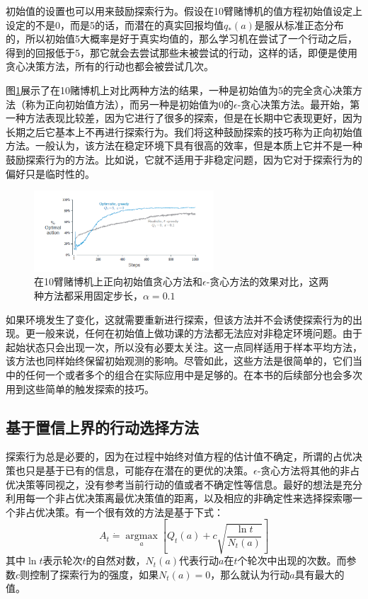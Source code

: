 \documentclass{ctexart}
\begin{document}
            初始值的设置也可以用来鼓励探索行为。假设在10臂赌博机的值方程初始值设定上设定的不是0，而是5的话，而潜在的真实回报均值$q_*(a)$是服从标准正态分布的，所以初始值5大概率是好于真实均值的，那么学习机在尝试了一个行动之后，得到的回报低于5，那它就会去尝试那些未被尝试的行动，这样的话，即便是使用贪心决策方法，所有的行动也都会被尝试几次。

            图\ref{f2_3}展示了在10赌博机上对比两种方法的结果，一种是初始值为5的完全贪心决策方法（称为正向初始值方法），而另一种是初始值为0的$\epsilon$-贪心决策方法。最开始，第一种方法表现比较差，因为它进行了很多的探索，但是在长期中它表现更好，因为长期之后它基本上不再进行探索行为。我们将这种鼓励探索的技巧称为正向初始值方法。一般认为，该方法在稳定环境下具有很高的效率，但是本质上它并不是一种鼓励探索行为的方法。比如说，它就不适用于非稳定问题，因为它对于探索行为的偏好只是临时性的。
            \begin{figure}
                \centering
                \includegraphics[width=0.6\textwidth]{f2-3}
                \caption{在10臂赌博机上正向初始值贪心方法和$\epsilon$-贪心方法的效果对比，这两种方法都采用固定步长，$\alpha=0.1$}
                \label{f2_3}
            \end{figure}
            如果环境发生了变化，这就需要重新进行探索，但该方法并不会诱使探索行为的出现。更一般来说，任何在初始值上做功课的方法都无法应对非稳定环境问题。由于起始状态只会出现一次，所以没有必要太关注。这一点同样适用于样本平均方法，该方法也同样始终保留初始观测的影响。尽管如此，这些方法是很简单的，它们当中的任何一个或者多个的组合在实际应用中是足够的。在本书的后续部分也会多次用到这些简单的触发探索的技巧。

        \subsection{基于置信上界的行动选择方法}
            探索行为总是必要的，因为在过程中始终对值方程的估计值不确定，所谓的占优决策也只是基于已有的信息，可能存在潜在的更优的决策。$\epsilon$-贪心方法将其他的非占优决策等同视之，没有参考当前行动的值或者不确定性等信息。最好的想法是充分利用每一个非占优决策离最优决策值的距离，以及相应的非确定性来选择探索哪一个非占优决策。有一个很有效的方法是基于下式：
            \begin{equation}
                A_t \dot{=} \operatorname*{argmax}\limits_{a} [Q_t(a) + c\sqrt{\frac{\ln t}{N_t(a)}}]
                \label{e2.10}
            \end{equation}
            其中$\ln t$表示轮次$t$的自然对数，$N_t(a)$代表行动$a$在$t$个轮次中出现的次数。而参数$c$则控制了探索行为的强度，如果$N_t(a)=0$，那么就认为行动$a$具有最大的值。
\end{document}
